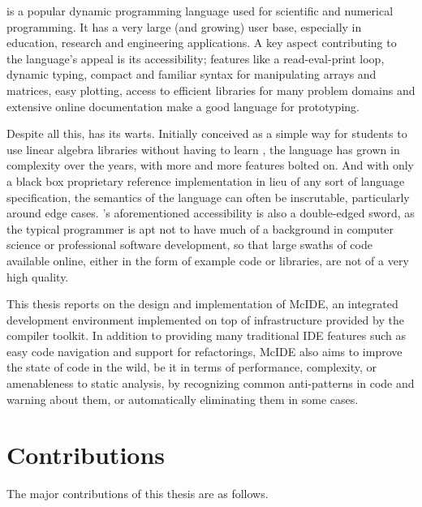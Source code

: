 \matlab is a popular dynamic programming language used for scientific and
numerical programming. It has a very large (and growing) user base, especially
in education, research and engineering applications. A key aspect contributing
to the language's appeal is its accessibility; features like a read-eval-print
loop, dynamic typing, compact and familiar syntax for manipulating arrays and
matrices, easy plotting, access to efficient libraries for many problem domains
and extensive online documentation make \matlab a good language for
prototyping.

Despite all this, \matlab has its warts. Initially conceived as a simple way
for students to use \fortran linear algebra libraries without having to learn
\fortran, the language has grown in complexity over the years, with more and
more features bolted on. And with only a black box proprietary reference
implementation in lieu of any sort of language specification, the semantics of
the language can often be inscrutable, particularly around edge cases.
\matlab's aforementioned accessibility is also a double-edged sword, as the
typical \matlab programmer is apt not to have much of a background in computer
science or professional software development, so that large swaths of \matlab
code available online, either in the form of example code or libraries, are not
of a very high quality.

This thesis reports on the design and implementation of McIDE, an integrated
development environment implemented on top of infrastructure provided by the
\mclab compiler toolkit. In addition to providing many traditional IDE features
such as easy code navigation and support for refactorings, McIDE also aims to
improve the state of \matlab code in the wild, be it in terms of performance,
complexity, or amenableness to static analysis, by recognizing common
anti-patterns in \matlab code and warning about them, or automatically
eliminating them in some cases.

\section{Contributions}

The major contributions of this thesis are as follows.

